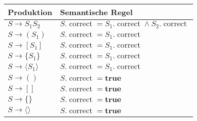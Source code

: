 \documentclass[a4paper,10pt]{scrartcl}
\begin{document}
\section{}
\begin{center}
\begin{tabular}{l|l}
\textbf{Produktion}         & \textbf{Semantische Regel} \\\hline
$S \to S_1S_2$              & $S.\operatorname{correct} = S_1.\operatorname{correct} \land S_2.\operatorname{correct}$\\
$S \to (S_1)$               & $S.\operatorname{correct} = S_1.\operatorname{correct}$\\
$S \to [S_1]$               & $S.\operatorname{correct} = S_1.\operatorname{correct}$\\
$S \to \{S_1\}$             & $S.\operatorname{correct} = S_1.\operatorname{correct}$\\
$S \to \langle S_1\rangle$  & $S.\operatorname{correct} = S_1.\operatorname{correct}$\\
$S \to ()$                  & $S.\operatorname{correct} = \mathbf{true}$\\
$S \to []$                  & $S.\operatorname{correct} = \mathbf{true}$\\
$S \to \{\}$                & $S.\operatorname{correct} = \mathbf{true}$\\
$S \to \langle\rangle$      & $S.\operatorname{correct} = \mathbf{true}$\\
\end{tabular}
\end{center}
\end{document}
